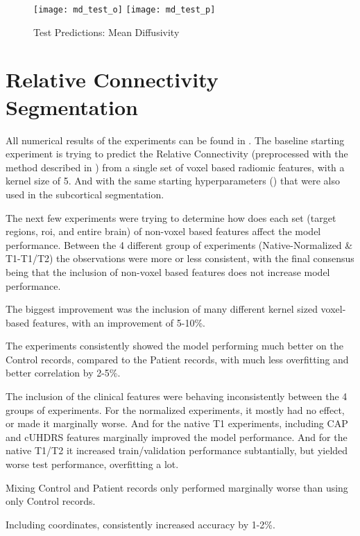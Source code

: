 \begin{figure}[H]
\centering
\texttt{[image: md\_test\_o]}
\texttt{[image: md\_test\_p]}
\caption{Test Predictions: Mean Diffusivity}
\label{fig:pred-tes-md}
\end{figure}

\section{Relative Connectivity Segmentation}

All numerical results of the experiments can be found in  .
The baseline starting experiment is trying to predict the Relative Connectivity (preprocessed with the method described in ) from a single set of voxel based radiomic features, with a kernel size of 5. And with the same starting hyperparameters () that were also used in the subcortical segmentation.\par
The next few experiments were trying to determine how does each set (target regions, roi, and entire brain) of non-voxel based features affect the model performance. Between the 4 different group of experiments (Native-Normalized \& T1-T1/T2) the observations were more or less consistent, with the final consensus being that the inclusion of non-voxel based features does not increase model performance.\par
The biggest improvement was the inclusion of many different kernel sized voxel-based features, with an improvement of 5-10\%.\par
The experiments consistently showed the model performing much better on the Control records, compared to the Patient records, with much less overfitting and better correlation by 2-5\%.\par
The inclusion of the clinical features were behaving inconsistently between the 4 groups of experiments. For the normalized experiments, it mostly had no effect, or made it marginally worse. And for the native T1 experiments, including \ac{CAP} and \ac{cUHDRS} features marginally improved the model performance. And for the native T1/T2 it increased train/validation performance subtantially, but yielded worse test performance, overfitting a lot.\par
Mixing Control and Patient records only performed marginally worse than using only Control records.\par
Including coordinates, consistently increased accuracy by 1-2\%.\par
